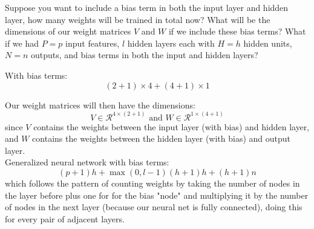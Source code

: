 \begin{Parts}
\begin{solution}
\end{solution}

\Part
Suppose you want to include a bias term in both the input layer and hidden layer,
how many weights will be trained in total now? What will be the dimensions of our weight matrices $V$ and $W$ if we include these bias terms?
What if we had $P=p$ input features, $l$ hidden layers each with $H=h$ hidden units, $N=n$ outputs, and bias terms in both the input and hidden layers?

\begin{solution}
With bias terms:
$$(2+1)\times 4 + (4+1)\times1$$

Our weight matrices will then have the dimensions:
$$V \in \mathcal{R}^{4 \times (2+1)} \text{ and } W \in \mathcal{R}^{1 \times (4+1)}$$
since $V$ contains the weights between the input layer (with bias) and hidden layer,
and $W$ contains the weights between the hidden layer (with bias) and output layer.\\

Generalized neural network with bias terms:
$$(p+1)h + \max(0,l-1)(h+1)h+(h+1)n$$
which follows the pattern of counting weights by taking the number of nodes in the layer before plus one for for the bias "node"
and multiplying it by the number of nodes in the next layer (because our neural net is fully connected), doing this for every pair of adjacent layers.
\end{solution}


\end{Parts}
